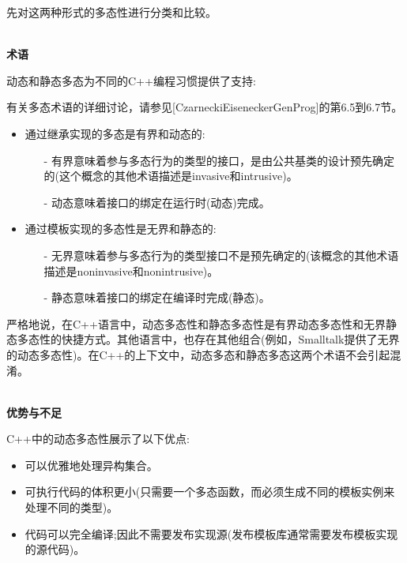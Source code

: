 
先对这两种形式的多态性进行分类和比较。

\hspace*{\fill} \\ %
\noindent
\textbf{术语}

动态和静态多态为不同的C++编程习惯提供了支持:

\begin{tcolorbox}[colback=webgreen!5!white,colframe=webgreen!75!black]
\hspace*{0.75cm}有关多态术语的详细讨论，请参见[CzarneckiEiseneckerGenProg]的第6.5到6.7节。
\end{tcolorbox}

\begin{itemize}
\item 
通过继承实现的多态是有界和动态的:

\begin{itemize}
\item[-]
有界意味着参与多态行为的类型的接口，是由公共基类的设计预先确定的(这个概念的其他术语描述是invasive和intrusive)。

\item[-]
动态意味着接口的绑定在运行时(动态)完成。
\end{itemize}

\item 
通过模板实现的多态性是无界和静态的:

\begin{itemize}
\item[-]
无界意味着参与多态行为的类型接口不是预先确定的(该概念的其他术语描述是noninvasive和nonintrusive)。

\item[-]
静态意味着接口的绑定在编译时完成(静态)。
\end{itemize}
\end{itemize}

严格地说，在C++语言中，动态多态性和静态多态性是有界动态多态性和无界静态多态性的快捷方式。其他语言中，也存在其他组合(例如，Smalltalk提供了无界的动态多态性)。在C++的上下文中，动态多态和静态多态这两个术语不会引起混淆。

\hspace*{\fill} \\ %
\noindent
\textbf{优势与不足}

C++中的动态多态性展示了以下优点:

\begin{itemize}
\item 
可以优雅地处理异构集合。

\item 
可执行代码的体积更小(只需要一个多态函数，而必须生成不同的模板实例来处理不同的类型)。

\item 
代码可以完全编译;因此不需要发布实现源(发布模板库通常需要发布模板实现的源代码)。
\end{itemize}

